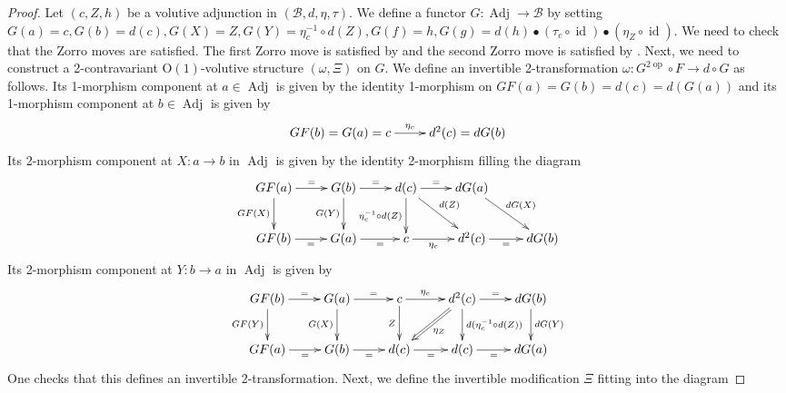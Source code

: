 \documentclass[10pt,a4paper]{amsart}
\newcommand{\Adj}{\operatorname{Adj}}%
\newcommand{\B}{\mathcal{B}}
\newcommand{\Oone}{\operatorname{O(1)}}
\newcommand{\id}{\operatorname{id}}%
\newcommand{\opp}{\operatorname{op}}%
\begin{document}
\begin{proof}
    Let $(c,Z,h)$ be a volutive adjunction in $(\B,d,\eta,\tau)$. We define a functor $G \colon \Adj \to \B$ by setting $G(a) = c, G(b) = d(c), G(X) = Z, G(Y) = \eta_c^{-1} \circ d(Z), G(f) = h, G(g) = d(h) \bullet (\tau_c \circ \id) \bullet (\eta_Z \circ \id)$. 
    We need to check that the Zorro moves are satisfied. The first Zorro move is satisfied by 
    and the second Zorro move is satisfied by . Next, we need to construct a 2-contravariant 
    $\Oone$-volutive structure $(\omega,\Xi)$ on $G$. We define an invertible 2-transformation $\omega \colon G^{2\opp} \circ F \to d \circ G$ as follows. 
    Its 1-morphism component at $a \in \Adj$ is given by the identity 1-morphism on $GF(a) = G(b) = d(c) = d(G(a))$ and its 1-morphism component at 
    $b \in \Adj$ is given by 
    \begin{equation}
        \xymatrix{
            GF(b) = G(a) = c \ar[r]^-{\eta_c} & d^2(c) =d G(b)
        }
    \end{equation}
    Its 2-morphism component at $X \colon a \to b$ in $\Adj$ is given by the identity 2-morphism filling the diagram 
    \begin{equation}
        \begin{aligned}
        \xymatrix{
            GF(a) \ar[r]^-{=} \ar[d]_-{GF(X)} & G(b) \ar[r]^-{=} \ar[d]_-{G(Y) }& d(c) \ar[d]_-{\eta_c^{-1} \circ d(Z)} \ar[r]^-{=} \ar[dr]^-{d(Z)} &dG(a) \ar[dr]^-{dG(X)}\\
            GF(b) \ar[r]_-{=} & G(a) \ar[r]_-{=} & c \ar[r]_-{\eta_c} & d^2(c) \ar[r]_-{=} &dG(b)
        }
        \end{aligned}
    \end{equation}
    Its 2-morphism component at $Y \colon b \to a$ in $\Adj$ is given by 
    \begin{equation}
        \begin{aligned}
        \xymatrix{
            GF(b) \ar[r]^-{=} \ar[d]_-{GF(Y)} & G(a) \ar[r]^-{=} \ar[d]_{G(X)} & c \ar[r]^-{\eta_c} \ar[d]_-{Z} & d^2(c) \ar[r]^-{=} \ar[d]^-{d(\eta_c^{-1} \circ d(Z))} \ar@{=>}[dl]^-{\eta_Z} & dG(b) \ar[d]^-{dG(Y)} \\
            GF(a) \ar[r]_-{=} & G(b) \ar[r]_-{=} & d(c) \ar[r]_-{=} & d(c) \ar[r]_-{=} & dG(a)
        }
        \end{aligned}
    \end{equation}
    One checks that this defines an invertible 2-transformation. Next, we define the invertible modification $\Xi$ fitting into the diagram 

\end{proof}
\end{document}
